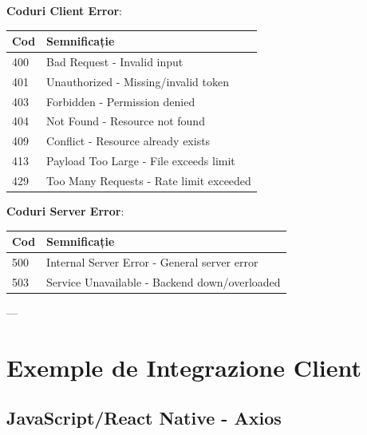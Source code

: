 \textbf{Coduri Client Error}:
\begin{table}[h]
    \centering
    \begin{tabular}{|l|l|}
    \hline
    \textbf{Cod} & \textbf{Semnificație} \\ \hline
    400 & Bad Request - Invalid input \\ \hline
    401 & Unauthorized - Missing/invalid token \\ \hline
    403 & Forbidden - Permission denied \\ \hline
    404 & Not Found - Resource not found \\ \hline
    409 & Conflict - Resource already exists \\ \hline
    413 & Payload Too Large - File exceeds limit \\ \hline
    429 & Too Many Requests - Rate limit exceeded \\ \hline
    \end{tabular}
\end{table}

\textbf{Coduri Server Error}:
\begin{table}[h]
    \centering
    \begin{tabular}{|l|l|}
    \hline
    \textbf{Cod} & \textbf{Semnificație} \\ \hline
    500 & Internal Server Error - General server error \\ \hline
    503 & Service Unavailable - Backend down/overloaded \\ \hline
    \end{tabular}
\end{table}

---

\section{Exemple de Integrazione Client}

\subsection{JavaScript/React Native - Axios}

